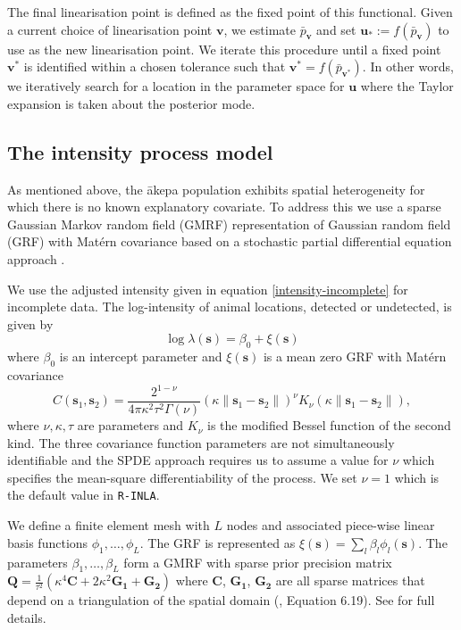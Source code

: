 \documentclass{statsoc}
\newcommand{\bs}{\mathbf{s}}
\newcommand{\bm}{\boldsymbol}  %
\newcommand{\akepa}{\textquotesingle\={a}kepa}  %
\begin{document}
The final linearisation point is defined as the fixed point of this functional.  Given a current choice of linearisation point $\bm{v}$, we estimate $\bar{p}_{\bm{v}}$ and set $\bm{u}_* :=f(\bar{p}_{\bm{v}})$ to use as the new linearisation point.  We iterate this procedure until a fixed point $\bm{v}^*$ is identified within a chosen tolerance such that $\bm{v}^* = f(\bar{p}_{\bm{v}^*})$.  In other words, we iteratively search for a location in the parameter space for $\bm{u}$ where the Taylor expansion is taken about the posterior mode.  

\subsection{The intensity process model}
\label{sec-gmrf}

As mentioned above, the \akepa{} population exhibits spatial heterogeneity for which there is no known explanatory covariate.  To address this we use a sparse Gaussian Markov random field (GMRF) representation of Gaussian random field (GRF) with Mat\'ern covariance based on a stochastic partial differential equation approach \citep{lindgren_explicit_2011}.  

We use the adjusted intensity given in equation \eqref{intensity-incomplete} for incomplete data.  The log-intensity of animal locations, detected or undetected, is given by
\begin{equation*}
\log \lambda(\bs) = \beta_0 + \xi(\bs)
\end{equation*}
where $\beta_0$ is an intercept parameter and $\xi(\bs)$ is a mean zero GRF with Mat\'ern covariance
\begin{equation}
C(\bs_1,\bs_2) = \frac{2^{1-\nu}}{4\pi\kappa^2\tau^2\Gamma(\nu)}(\kappa \|\bs_1-\bs_2\|)^{\nu}K_\nu(\kappa \|\bs_1-\bs_2\|),
\end{equation}
where \(\nu, \kappa, \tau\) are parameters and \(K_{\nu}\) is the modified Bessel function of the second kind.  The three covariance function parameters are not simultaneously identifiable \citep{zhang_inconsistent_2004} and the SPDE approach requires us to assume a value for $\nu$ which specifies the mean-square differentiability of the process.  We set $\nu = 1$ which is the default value in \texttt{R-INLA}.

We define a finite element mesh with $L$ nodes and associated piece-wise linear basis functions $\phi_1, \ldots, \phi_L$. The GRF is represented as $\xi(\bs) = \sum_l \beta_l \phi_l(\bs)$.  The parameters $\beta_1, \ldots, \beta_L$ form a GMRF with sparse prior precision matrix $\bm{Q} = \frac{1}{\tau^2}\left(\kappa^4\bm{C} + 2\kappa^2\bm{G_1} + \bm{G_2}\right)$ where $\bm{C}$, $\bm{G_1}$, $\bm{G_2}$ are all sparse matrices that depend on a triangulation of the spatial domain (\cite{blangiardo_spatial_2013}, Equation 6.19). See \cite{lindgren_explicit_2011} for full details. 
\end{document}

